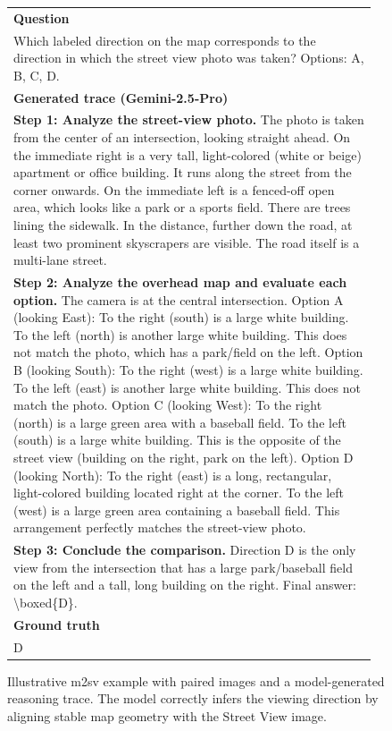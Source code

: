 \documentclass{article}
\begin{document}
\begin{figure}[t]
  \vspace{0.75em}
  \begin{minipage}{0.98\linewidth}
    \footnotesize
    \begin{tabular}{p{0.96\linewidth}}
      \toprule
      \textbf{Question} \\
      Which labeled direction on the map corresponds to the direction in which the street view photo was taken? Options: A, B, C, D. \\
      \midrule
      \textbf{Generated trace (Gemini-2.5-Pro)} \\
      \textbf{Step 1: Analyze the street-view photo.} The photo is taken from the center of an intersection, looking straight ahead. On the immediate right is a very tall, light-colored (white or beige) apartment or office building. It runs along the street from the corner onwards. On the immediate left is a fenced-off open area, which looks like a park or a sports field. There are trees lining the sidewalk. In the distance, further down the road, at least two prominent skyscrapers are visible. The road itself is a multi-lane street. \\
      \textbf{Step 2: Analyze the overhead map and evaluate each option.} The camera is at the central intersection. Option A (looking East): To the right (south) is a large white building. To the left (north) is another large white building. This does not match the photo, which has a park/field on the left. Option B (looking South): To the right (west) is a large white building. To the left (east) is another large white building. This does not match the photo. Option C (looking West): To the right (north) is a large green area with a baseball field. To the left (south) is a large white building. This is the opposite of the street view (building on the right, park on the left). Option D (looking North): To the right (east) is a long, rectangular, light-colored building located right at the corner. To the left (west) is a large green area containing a baseball field. This arrangement perfectly matches the street-view photo. \\
      \textbf{Step 3: Conclude the comparison.} Direction D is the only view from the intersection that has a large park/baseball field on the left and a tall, long building on the right. Final answer: \textbackslash boxed\{D\}. \\
      \midrule
      \textbf{Ground truth} \\
      D \\
      \bottomrule
    \end{tabular}
  \end{minipage}

  \caption{Illustrative m2sv example with paired images and a model-generated
  reasoning trace. The model correctly infers the viewing direction by aligning
  stable map geometry with the Street View image.}
  \label{fig:m2sv-example}
\end{figure}
\end{document}
